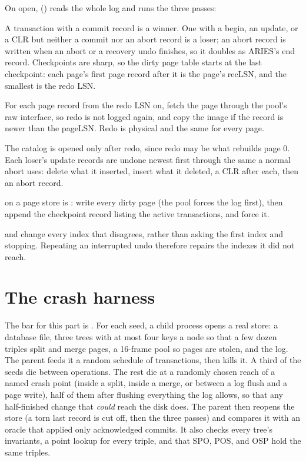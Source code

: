 \begin{ontodb}[: ARIES]
On open,  () reads the
whole log and runs the three passes:

\begin{description}[leftmargin=1.2em]
\item[Analysis.] A transaction with a commit record is a winner. One with a begin, an update, or a CLR but neither a commit nor an abort record is a loser; an abort record is written when an abort or a recovery undo finishes, so it doubles as ARIES's end record. Checkpoints are sharp, so the dirty page table starts at the last checkpoint: each page's first page record after it is the page's recLSN, and the smallest is the redo LSN.
\item[Redo.] For each page record from the redo LSN on, fetch the page through the pool's raw interface, so redo is not logged again, and copy the image if the record is newer than the pageLSN. Redo is physical and the same for every page.
\item[Undo.] The catalog is opened only after redo, since redo may be what rebuilds page 0. Each loser's update records are undone newest first through the same  a normal abort uses: delete what it inserted, insert what it deleted, a CLR after each, then an abort record.
\end{description}

 on a page store is :
write every dirty page (the pool forces the log first), then append the
checkpoint record listing the active transactions, and force it.

 and  change every index that
disagrees, rather than asking the first index and stopping. Repeating an
interrupted undo therefore repairs the indexes it did not reach.
\end{ontodb}

\section{The crash harness}

The bar for this part is . For each seed,
a child process opens a real store: a database file, three trees with at most
four keys a node so that a few dozen triples split and merge pages, a 16-frame
pool so pages are stolen, and the log. The parent feeds it a random schedule
of transactions, then kills it. A third of the seeds die between operations.
The rest die at a randomly chosen reach of a named crash point (inside a
split, inside a merge, or between a log flush and a page write), half of them
after flushing everything the log allows, so that any half-finished change that
\emph{could} reach the disk does. The parent then reopens the store (a torn
last record is cut off, then the three passes) and compares it with an oracle
that applied only acknowledged commits. It also checks every tree's
invariants, a point lookup for every triple, and that SPO, POS, and OSP hold
the same triples.

